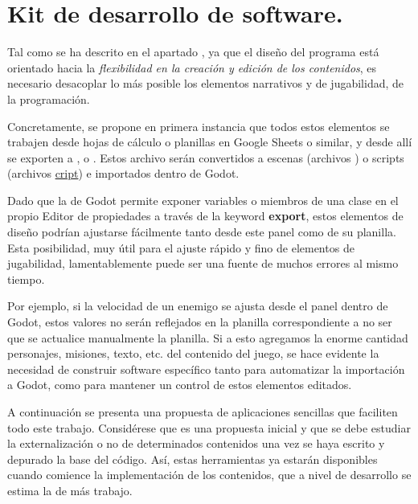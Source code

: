 
\section{Kit de desarrollo de software.}\label{kit:kit-de-desarrollo}

Tal como se ha descrito en el apartado , ya que el diseño del programa está orientado hacia la \emph{flexibilidad en la creación y edición de los contenidos}, es necesario desacoplar lo más posible los elementos narrativos y de jugabilidad, de la programación.

Concretamente, se propone en primera instancia que todos estos elementos se trabajen desde hojas de cálculo o planillas en Google Sheets o similar, y desde allí se exporten a ,  o . Estos archivo serán convertidos a escenas (archivos \href{https://docs.godotengine.org/es/stable/development/file_formats/tscn.html}{}) o scripts (archivos \href{https://docs.godotengine.org/es/stable/development/file_formats/gdscript_grammar.html}{cript}) e importados dentro de Godot.

Dado que la  de Godot permite exponer variables o miembros de una clase en el propio Editor de propiedades a través de la keyword \textbf{export}, estos elementos de diseño podrían ajustarse fácilmente tanto desde este panel como de su planilla. Esta posibilidad, muy útil para el ajuste rápido y fino de elementos de jugabilidad, lamentablemente puede ser una fuente de muchos errores al mismo tiempo.

Por ejemplo, si la velocidad de un enemigo se ajusta desde el panel dentro de Godot, estos valores no serán reflejados en la planilla correspondiente a no ser que se actualice manualmente la planilla. Si a esto agregamos la enorme cantidad personajes, misiones, texto, etc. del contenido del juego, se hace evidente la necesidad de construir software específico tanto para automatizar la importación a Godot, como para mantener un control de estos elementos editados.

A continuación se presenta una propuesta de aplicaciones sencillas que faciliten todo este trabajo. Considérese que es una propuesta inicial y que se debe estudiar la externalización o no de determinados contenidos una vez se haya escrito y depurado la base del código. Así, estas herramientas ya estarán disponibles cuando comience la implementación de los contenidos, que a nivel de desarrollo se estima la de más trabajo.

